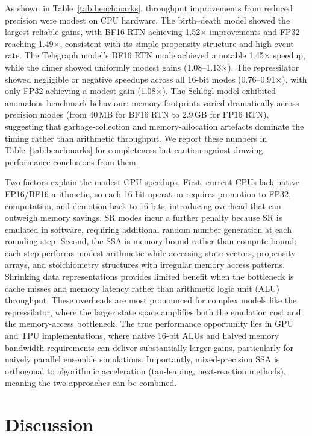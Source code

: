 \documentclass{article}
\begin{document}
As shown in Table~\ref{tab:benchmarks}, throughput improvements from reduced precision were modest on CPU hardware. The birth--death model showed the largest reliable gains, with BF16 RTN achieving 1.52$\times$ improvements and FP32 reaching 1.49$\times$, consistent with its simple propensity structure and high event rate. The Telegraph model's BF16 RTN mode achieved a notable 1.45$\times$ speedup, while the dimer showed uniformly modest gains (1.08--1.13$\times$). The repressilator showed negligible or negative speedups across all 16-bit modes (0.76--0.91$\times$), with only FP32 achieving a modest gain (1.08$\times$). The Schl\"{o}gl model exhibited anomalous benchmark behaviour: memory footprints varied dramatically across precision modes (from 40\,MB for BF16 RTN to 2.9\,GB for FP16 RTN), suggesting that garbage-collection and memory-allocation artefacts dominate the timing rather than arithmetic throughput. We report these numbers in Table~\ref{tab:benchmarks} for completeness but caution against drawing performance conclusions from them.

Two factors explain the modest CPU speedups. First, current CPUs lack native FP16/BF16 arithmetic, so each 16-bit operation requires promotion to FP32, computation, and demotion back to 16 bits, introducing overhead that can outweigh memory savings. SR modes incur a further penalty because SR is emulated in software, requiring additional random number generation at each rounding step. Second, the SSA is memory-bound rather than compute-bound: each step performs modest arithmetic while accessing state vectors, propensity arrays, and stoichiometry structures with irregular memory access patterns. Shrinking data representations provides limited benefit when the bottleneck is cache misses and memory latency rather than arithmetic logic unit (ALU) throughput. These overheads are most pronounced for complex models like the repressilator, where the larger state space amplifies both the emulation cost and the memory-access bottleneck. The true performance opportunity lies in GPU and TPU implementations, where native 16-bit ALUs and halved memory bandwidth requirements can deliver substantially larger gains, particularly for naively parallel ensemble simulations. Importantly, mixed-precision SSA is orthogonal to algorithmic acceleration (tau-leaping, next-reaction methods), meaning the two approaches can be combined.

\section{Discussion}
\label{sec:discussion}
\end{document}
